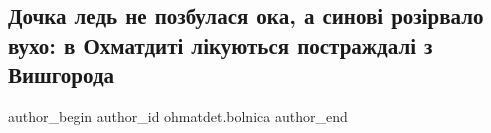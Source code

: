  
 
 
 
 
 
\subsection{Дочка ледь не позбулася ока, а синові розірвало вухо: в Охматдиті лікуються постраждалі з Вишгорода}
\label{sec:09_12_2022.fb.ohmatdet.bolnica.1.vyshgorod}
 
\ifcmt
 author_begin
   author_id ohmatdet.bolnica
 author_end
\fi

